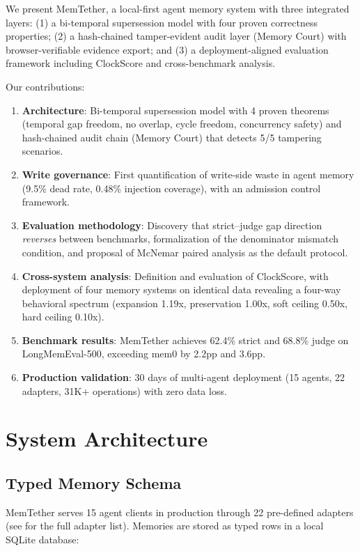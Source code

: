 \documentclass[sigconf,nonacm]{acmart}
\begin{document}
We present MemTether, a local-first agent memory system with three integrated layers: (1) a bi-temporal supersession model with four proven correctness properties; (2) a hash-chained tamper-evident audit layer (Memory Court) with browser-verifiable evidence export; and (3) a deployment-aligned evaluation framework including ClockScore and cross-benchmark analysis.

Our contributions:
\begin{enumerate}
\item \textbf{Architecture}: Bi-temporal supersession model with 4 proven theorems (temporal gap freedom, no overlap, cycle freedom, concurrency safety) and hash-chained audit chain (Memory Court) that detects 5/5 tampering scenarios.
\item \textbf{Write governance}: First quantification of write-side waste in agent memory (9.5\% dead rate, 0.48\% injection coverage), with an admission control framework.
\item \textbf{Evaluation methodology}: Discovery that strict--judge gap direction \emph{reverses} between benchmarks, formalization of the denominator mismatch condition, and proposal of McNemar paired analysis as the default protocol.
\item \textbf{Cross-system analysis}: Definition and evaluation of ClockScore, with deployment of four memory systems on identical data revealing a four-way behavioral spectrum (expansion 1.19x, preservation 1.00x, soft ceiling 0.50x, hard ceiling 0.10x).
\item \textbf{Benchmark results}: MemTether achieves 62.4\% strict and 68.8\% judge on LongMemEval-500, exceeding mem0 by 2.2pp and 3.6pp.
\item \textbf{Production validation}: 30 days of multi-agent deployment (15 agents, 22 adapters, 31K+ operations) with zero data loss.
\end{enumerate}

\section{System Architecture}
\label{sec:architecture}

\subsection{Typed Memory Schema}
MemTether serves 15 agent clients in production through 22 pre-defined adapters (see \cite{companionjss} for the full adapter list). Memories are stored as typed rows in a local SQLite database:
\end{document}
